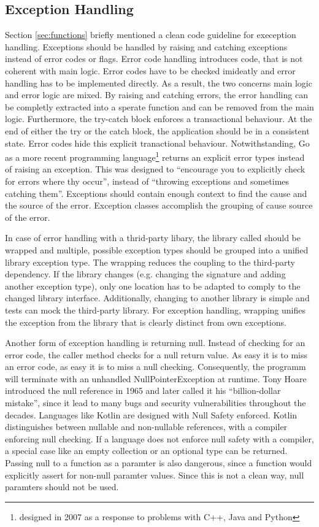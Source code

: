 \subsection{Exception Handling}
Section \ref{sec:functions} briefly mentioned a clean code guideline for exeception handling. Exceptions should be handled by raising and catching exceptions instead of error codes or flags. Error code handling introduces code, that is not coherent with main logic. Error codes have to be checked imideatly and error handling has to be implemented directly. As a result, the two concerns main logic and error logic are mixed. By raising and catching errors, the error handling can be completly extracted into a sperate function and can be removed from the main logic. Furthermore, the try-catch block enforces a transactional behaviour. At the end of either the try or the catch block, the application should be in a consistent state. Error codes hide this explicit tranactional behaviour. Notwithstanding, Go as a more recent programming language\footnote{designed in 2007 as a response to problems with C++, Java and Python\cite{noauthor_go_nodate}} returns an explicit error types instead of raising an exception. This was designed to \enquote{encourage you to explicitly check for errors where thy occur}, instead of \enquote{throwing exceptions and sometimes catching them}\cite{gerrand_error_2011}.   
Exceptions should contain enough context to find the cause and the source of the error. Exception classes accomplish the grouping of cause source of the error. 

In case of error handling with a thrid-party libary, the library called should be wrapped and multiple, possible exception types should be grouped into a unified library exception type. The wrapping reduces the coupling to the third-party dependency. If the library changes (e.g. changing the signature and adding another exception type), only one location has to be adapted to comply to the changed library interface. Additionally, changing to another library is simple and tests can mock the third-party library. For exception handling, wrapping unifies the exception from the library that is clearly distinct from own exceptions.

Another form of exception handling is returning null. Instead of checking for an error code, the caller method checks for a null return value. As easy it is to miss an error code, as easy it is to miss a null checking. Consequently, the programm will terminate with an unhandled NullPointerException at runtime. Tony Hoare introduced the null reference in 1965 and later called it his \enquote{billion-dollar mistake}\cite{hoare_null_2009}, since it lead to many bugs and security vulnerabilities throughout the decades. Languages like Kotlin are designed with Null Safety enforced. Kotlin distinguishes between nullable and non-nullable references, with a compiler enforcing null checking\cite{noauthor_null_nodate}. If a language does not enforce null safety with a compiler, a special case like an empty collection or an optional type can be returned. Passing null to a function as a paramter is also dangerous, since a function would explicitly assert for non-null paramter values. Since this is not a clean way, null paramters should not be used.

